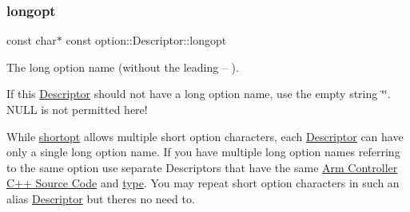 \subsubsection{\texorpdfstring{longopt}{longopt}}
{\footnotesize\ttfamily const char$\ast$ const option\+::\+Descriptor\+::longopt}



The long option name (without the leading {\ttfamily --} ). 

If this \hyperlink{structoption_1_1Descriptor}{Descriptor} should not have a long option name, use the empty string \char`\"{}\char`\"{}. N\+U\+LL is not permitted here!

While \hyperlink{structoption_1_1Descriptor_a0dba4ccca59c19d6ed4081391fca5adb}{shortopt} allows multiple short option characters, each \hyperlink{structoption_1_1Descriptor}{Descriptor} can have only a single long option name. If you have multiple long option names referring to the same option use separate Descriptors that have the same \hyperlink{index}{Arm Controller C++ Source Code} and \hyperlink{structoption_1_1Descriptor_a1b220dabd8aad075fa441a80f9b9343c}{type}. You may repeat short option characters in such an alias \hyperlink{structoption_1_1Descriptor}{Descriptor} but there\textquotesingle{}s no need to.

